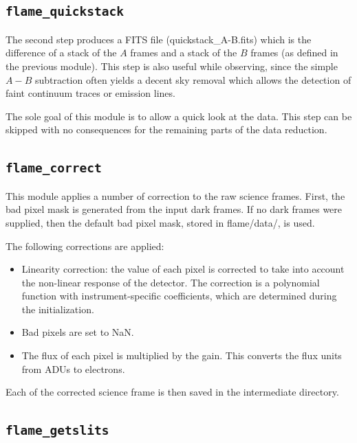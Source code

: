 \documentclass[a4paper, notitlepage]{article}
\begin{document}
\subsection{\texttt{flame\_quickstack}}

The second step produces a FITS file (quickstack\_A-B.fits) which is the difference of a stack of the $A$ frames and a stack of the $B$ frames (as defined in the previous module). This step is also useful while observing, since the simple $A-B$ subtraction often yields a decent sky removal which allows the detection of faint continuum traces or emission lines.

The sole goal of this module is to allow a quick look at the data. This step can be skipped with no consequences for the remaining parts of the data reduction.



\subsection{\texttt{flame\_correct}}

This module applies a number of correction to the raw science frames. First, the bad pixel mask is generated from the input dark frames. If no dark frames were supplied, then the default bad pixel mask, stored in flame/data/, is used.

The following corrections are applied:
\begin{itemize}
\item Linearity correction: the value of each pixel is corrected to take into account the non-linear response of the detector. The correction is a polynomial function with instrument-specific coefficients, which are determined during the initialization.
\item Bad pixels are set to NaN.
\item The flux of each pixel is multiplied by the gain. This converts the flux units from ADUs to electrons.
\end{itemize}

Each of the corrected science frame is then saved in the intermediate directory.


\subsection{\texttt{flame\_getslits}}
\label{sec:getslits}
\end{document}
